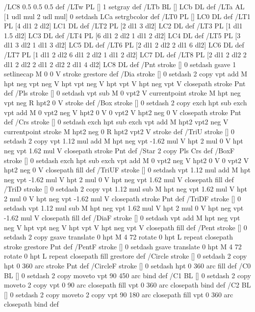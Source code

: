 /LC8 {0.5 0.5 0.5} def
/LTw {PL [] 1 setgray} def
/LTb {BL [] LCb DL} def
/LTa {AL [1 udl mul 2 udl mul] 0 setdash LCa setrgbcolor} def
/LT0 {PL [] LC0 DL} def
/LT1 {PL [4 dl1 2 dl2] LC1 DL} def
/LT2 {PL [2 dl1 3 dl2] LC2 DL} def
/LT3 {PL [1 dl1 1.5 dl2] LC3 DL} def
/LT4 {PL [6 dl1 2 dl2 1 dl1 2 dl2] LC4 DL} def
/LT5 {PL [3 dl1 3 dl2 1 dl1 3 dl2] LC5 DL} def
/LT6 {PL [2 dl1 2 dl2 2 dl1 6 dl2] LC6 DL} def
/LT7 {PL [1 dl1 2 dl2 6 dl1 2 dl2 1 dl1 2 dl2] LC7 DL} def
/LT8 {PL [2 dl1 2 dl2 2 dl1 2 dl2 2 dl1 2 dl2 2 dl1 4 dl2] LC8 DL} def
/Pnt {stroke [] 0 setdash gsave 1 setlinecap M 0 0 V stroke grestore} def
/Dia {stroke [] 0 setdash 2 copy vpt add M
  hpt neg vpt neg V hpt vpt neg V
  hpt vpt V hpt neg vpt V closepath stroke
  Pnt} def
/Pls {stroke [] 0 setdash vpt sub M 0 vpt2 V
  currentpoint stroke M
  hpt neg vpt neg R hpt2 0 V stroke
 } def
/Box {stroke [] 0 setdash 2 copy exch hpt sub exch vpt add M
  0 vpt2 neg V hpt2 0 V 0 vpt2 V
  hpt2 neg 0 V closepath stroke
  Pnt} def
/Crs {stroke [] 0 setdash exch hpt sub exch vpt add M
  hpt2 vpt2 neg V currentpoint stroke M
  hpt2 neg 0 R hpt2 vpt2 V stroke} def
/TriU {stroke [] 0 setdash 2 copy vpt 1.12 mul add M
  hpt neg vpt -1.62 mul V
  hpt 2 mul 0 V
  hpt neg vpt 1.62 mul V closepath stroke
  Pnt} def
/Star {2 copy Pls Crs} def
/BoxF {stroke [] 0 setdash exch hpt sub exch vpt add M
  0 vpt2 neg V hpt2 0 V 0 vpt2 V
  hpt2 neg 0 V closepath fill} def
/TriUF {stroke [] 0 setdash vpt 1.12 mul add M
  hpt neg vpt -1.62 mul V
  hpt 2 mul 0 V
  hpt neg vpt 1.62 mul V closepath fill} def
/TriD {stroke [] 0 setdash 2 copy vpt 1.12 mul sub M
  hpt neg vpt 1.62 mul V
  hpt 2 mul 0 V
  hpt neg vpt -1.62 mul V closepath stroke
  Pnt} def
/TriDF {stroke [] 0 setdash vpt 1.12 mul sub M
  hpt neg vpt 1.62 mul V
  hpt 2 mul 0 V
  hpt neg vpt -1.62 mul V closepath fill} def
/DiaF {stroke [] 0 setdash vpt add M
  hpt neg vpt neg V hpt vpt neg V
  hpt vpt V hpt neg vpt V closepath fill} def
/Pent {stroke [] 0 setdash 2 copy gsave
  translate 0 hpt M 4 {72 rotate 0 hpt L} repeat
  closepath stroke grestore Pnt} def
/PentF {stroke [] 0 setdash gsave
  translate 0 hpt M 4 {72 rotate 0 hpt L} repeat
  closepath fill grestore} def
/Circle {stroke [] 0 setdash 2 copy
  hpt 0 360 arc stroke Pnt} def
/CircleF {stroke [] 0 setdash hpt 0 360 arc fill} def
/C0 {BL [] 0 setdash 2 copy moveto vpt 90 450 arc} bind def
/C1 {BL [] 0 setdash 2 copy moveto
	2 copy vpt 0 90 arc closepath fill
	vpt 0 360 arc closepath} bind def
/C2 {BL [] 0 setdash 2 copy moveto
	2 copy vpt 90 180 arc closepath fill
	vpt 0 360 arc closepath} bind def
